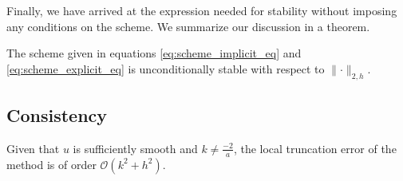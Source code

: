 Finally, we have arrived at the expression needed for stability
without imposing any conditions on the scheme.
We summarize our discussion in a theorem.

\begin{theorem}
    \label{stability}
  The scheme given in equations \eqref{eq:scheme_implicit_eq}
  and \eqref{eq:scheme_explicit_eq} is unconditionally stable
  with respect to \( \lVert \cdot \rVert_{2,h} \).
\end{theorem}

\subsection{Consistency}

\begin{theorem}
    \label{consistent}
  Given that $u$ is sufficiently smooth and $k \neq \frac{-2}{a}$, the local truncation error of the method is of order $\mathcal{O}(k^2 + h^2)$.
\end{theorem}

